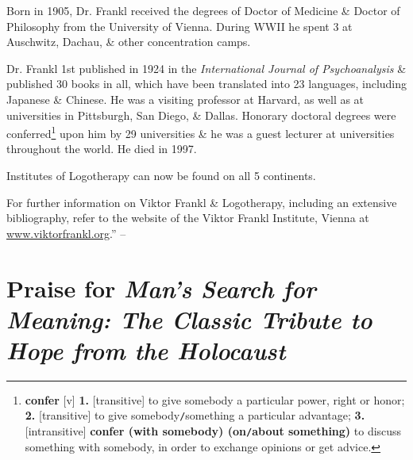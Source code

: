 \documentclass[oneside]{book}
\numberwithin{equation}{section}
\begin{document}
Born in 1905, Dr. Frankl received the degrees of Doctor of Medicine \& Doctor of Philosophy from the University of Vienna. During WWII he spent 3 at Auschwitz, Dachau, \& other concentration camps.

Dr. Frankl 1st published in 1924 in the \textit{International Journal of Psychoanalysis} \& published 30 books in all, which have been translated into 23 languages, including Japanese \& Chinese. He was a visiting professor at Harvard, as well as at  universities in Pittsburgh, San Diego, \& Dallas. Honorary doctoral degrees were conferred\footnote{\textbf{confer} [v] \textbf{1.} [transitive] to give somebody a particular power, right or honor; \textbf{2.} [transitive] to give somebody\texttt{/}something a particular advantage; \textbf{3.} [intransitive] \textbf{confer (with somebody) (on\texttt{/}about something)} to discuss something with somebody, in order to exchange opinions or get advice.} upon him by 29 universities \& he was a guest lecturer at universities throughout the world. He died in 1997.

Institutes of Logotherapy can now be found on all 5 continents.

For further information on Viktor Frankl \& Logotherapy, including an extensive bibliography, refer to the website of the Viktor Frankl Institute, Vienna at \url{www.viktorfrankl.org}.'' -- \cite[p. 4]{Frankl2013}


\section*{Praise for \textit{Man's Search for Meaning: The Classic Tribute to Hope from the Holocaust}}
\end{document}
